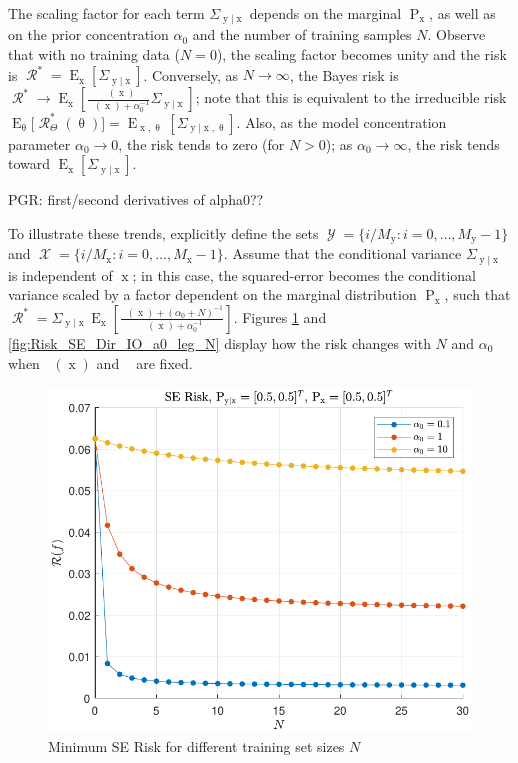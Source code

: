 \documentclass[12pt]{report}
\DeclareMathOperator{\xrm}{\mathrm{x}}
\DeclareMathOperator{\yrm}{\mathrm{y}}
\DeclareMathOperator{\Prm}{\mathrm{P}}
\DeclareMathOperator{\Erm}{\mathrm{E}}
\DeclareMathOperator{\Xcal}{\mathcal{X}}
\DeclareMathOperator{\Ycal}{\mathcal{Y}}
\DeclareMathOperator{\Rcal}{\mathcal{R}}
\DeclareMathOperator{\alpham}{\alpha_\text{m}}
\DeclareMathOperator{\alphac}{\alpha_\text{c}}
\begin{document}
The scaling factor for each term $\Sigma_{\yrm | \xrm}$ depends on the marginal $\Prm_{\xrm}$, as well as on the prior concentration $\alpha_0$ and the number of training samples $N$. Observe that with no training data ($N = 0$), the scaling factor becomes unity and the risk is $\Rcal^* = \Erm_{\xrm} \left[ \Sigma_{\yrm | \xrm} \right]$. Conversely, as $N \to \infty$, the Bayes risk is $\Rcal^* \to \Erm_{\xrm} \left[ \frac{\alpham(\xrm)}{\alpham(\xrm) + \alpha_0^{-1}} \Sigma_{\yrm | \xrm} \right]$; note that this is equivalent to the irreducible risk $\Erm_{\uptheta}\big[\Rcal_{\Theta}^*(\uptheta)\big] = \Erm_{\xrm,\uptheta} \left[ \Sigma_{\yrm | \xrm,\uptheta} \right]$. Also, as the model concentration parameter $\alpha_0 \to 0$, the risk tends to zero (for $N > 0$); as $\alpha_0 \to \infty$, the risk tends toward $\Erm_{\xrm} \left[ \Sigma_{\yrm | \xrm} \right]$.

PGR: first/second derivatives of alpha0??

To illustrate these trends, explicitly define the sets $\Ycal = \{ i/M_{\yrm} : i = 0,\ldots,M_{\yrm}-1 \}$ and $\Xcal = \{ i/M_{\xrm} : i = 0,\ldots,M_{\xrm}-1 \}$. Assume that the conditional variance $\Sigma_{\yrm | \xrm}$ is independent of $\xrm$; in this case, the squared-error becomes the conditional variance scaled by a factor dependent on the marginal distribution $\Prm_{\xrm}$, such that $\Rcal^* = \Sigma_{\yrm | \xrm} \Erm_{\xrm} \left[ \frac{\alpham(\xrm) + (\alpha_0+N)^{-1}}{\alpham(\xrm) + \alpha_0^{-1}} \right]$.  Figures \ref{fig:Risk_SE_Dir_IO_N_leg_a0} and \ref{fig:Risk_SE_Dir_IO_a0_leg_N} display how the risk changes with $N$ and $\alpha_0$ when $\alphac(\xrm)$ and $\alpham$ are fixed.

\begin{figure}
\centering
\includegraphics[width=0.7\linewidth]{Risk_SE_Dir_IO_N_leg_a0.pdf}
\caption{Minimum SE Risk for different training set sizes $N$}
\label{fig:Risk_SE_Dir_IO_N_leg_a0}
\end{figure}
\end{document}
